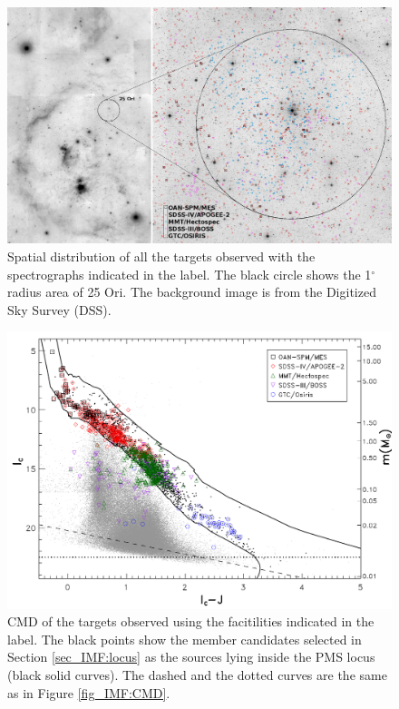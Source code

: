 \documentclass[12pt]{article}
\begin{document}
\begin{figure}[ht!]
	\includegraphics[width=1.0\textwidth]{sky_all_spectra.png}
	\caption[Spatial distribution of all the targets in our spectroscopic survey.]{Spatial distribution of all the targets observed with the spectrographs indicated in the label. The black circle shows the 1$^\circ$ radius area of 25 Ori. The background image is from the Digitized Sky Survey (DSS).}
	\label{fig:sky_all}
\end{figure}

\begin{figure}[ht!]
	\includegraphics[width=1.0\textwidth]{CMD_targets.pdf}
	\caption[CMD of the targets with spectra.]{CMD of the targets observed using the facitilities indicated in the label. The black points show the member candidates selected in Section \ref{sec_IMF:locus} as the sources lying inside the PMS locus (black solid curves). The dashed and the dotted curves are the same as in Figure \ref{fig_IMF:CMD}.}
	\label{fig:CMD_all}
\end{figure}
\end{document}
